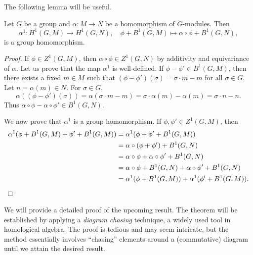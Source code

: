 The following lemma will be useful. 

\begin{lemma}
\label{lem:H1_maps}
    Let $G$ be a group and 
    $\alpha\colon M\to N$ be a homomorphism of $G$-modules. 
    Then 
    \[
    \alpha^1\colon H^1(G,M)\to H^1(G,N),\quad 
    \phi+B^1(G,M)\mapsto \alpha\circ\phi+B^1(G,N),
    \]
    is a group homomorphism. 
\end{lemma}

\begin{proof}
    If $\phi\in Z^1(G,M)$, then $\alpha\circ\phi\in Z^1(G,N)$ by additivity and equivariance of $\alpha$. Let us prove that the map $\alpha^1$ is well-defined. If 
    $\phi-\phi'\in B^1(G,M)$, then 
    there exists a fixed 
    $m\in M$ such that 
    $(\phi-\phi')(\sigma)=\sigma\cdot m-m$ for all $\sigma\in G$. 
    Let $n=\alpha(m)\in N$. 
    For $\sigma\in G$, 
    \[
    \alpha((\phi-\phi')(\sigma))=\alpha(\sigma\cdot m-m)
    =\sigma\cdot \alpha(m)-\alpha(m)=\sigma\cdot n-n. 
    \]
    Thus $\alpha\circ\phi-\alpha\circ\phi'\in B^1(G,N)$. 

    We now prove that $\alpha^1$ is a group homomorphism. If 
    $\phi,\phi'\in Z^1(G,M)$, then 
    \begin{align*}
    \alpha^1(\phi+B^1(G,M)+\phi'+B^1(G,M))
    &=\alpha^1(\phi+\phi'+B^1(G,M))\\
    &=\alpha\circ(\phi+\phi')+B^1(G,N)\\
    &=\alpha\circ\phi+\alpha\circ\phi'+B^1(G,N)\\
    &=\alpha\circ\phi+B^1(G,N)+\alpha\circ\phi'+B^1(G,N)\\
    &=\alpha^1(\phi+B^1(G,M))+\alpha^1(\phi'+B^1(G,M)).\qedhere
    \end{align*}
\end{proof}

We will provide a detailed proof of the upcoming result. 
The theorem will be established by applying a \emph{diagram chasing} technique, a widely used tool in homological algebra.
The proof is tedious and may seem intricate, but the method essentially 
involves ``chasing'' elements around a (commutative) diagram until we attain the desired result. 

